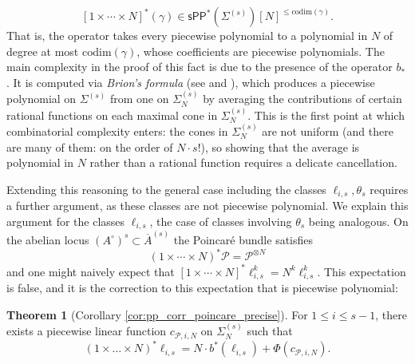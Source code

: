 \documentclass[11pt]{article}
\def\codim{\mathrm{codim}}
\newcommand{\barA}{\overline{A}}
\newcommand{\sPP}{\mathsf{sPP}}
\newcommand{\spp}{\sPP}
\theoremstyle{definition}
\newtheorem{theorem}[definition]{Theorem}
\begin{document}
\begin{equation}\label{eq:PPisNpoly}
[1 \times \cdots \times N]^*(\gamma) \in \spp^{\ast}(\Sigma^{(s)})[N]^{\le \codim(\gamma)}.
\end{equation}
That is, the operator takes every piecewise polynomial to a polynomial in $N$
of degree at most $\codim(\gamma)$, whose coefficients are piecewise
polynomials. The main complexity in the proof of this fact is due to the
presence of the operator $b_*$. It is computed via \emph{Brion's formula}
(see \cite{Brion} and \cite[Proposition~76]{LogarithmicTauPandha2024}),
which produces a piecewise polynomial on
$\Sigma^{(s)}$ from one on $\Sigma^{(s)}_N$ by averaging the contributions of
certain rational functions on each maximal cone in $\Sigma^{(s)}_N$. This is the
first point at which combinatorial complexity enters: the cones in
$\Sigma^{(s)}_N$ are not uniform (and there are many of them: on the order of $N\cdot s!$), so showing that the average is polynomial in
$N$ rather than a rational function requires a delicate cancellation.

Extending this reasoning to the general case including the classes $\ell_{i,s}, \theta_s$ requires a
further argument, as these classes are not piecewise polynomial. We explain this argument for the classes $\ell_{i,s}$, the case of classes involving $\theta_s$ being analogous. On the abelian locus $(A^{\circ})^s \subset \barA^{(s)}$ the Poincar\'e bundle satisfies
\[
(1 \times \cdots \times N)^*\mathcal{P} = \mathcal{P}^{\otimes N}
\]
and one might naively expect that $[1 \times \cdots \times N]^*\ell_{i,s}^k = N^k\ell_{i,s}^k$. This expectation is false, and it is the correction to this expectation that is piecewise polynomial:

\begin{theorem}[Corollary \ref{cor:pp_corr_poincare_precise}]\label{thm:pp_corr_poincare}
    For $1\le i \le s-1$, there exists a piecewise linear function $c_{\mathcal P,i,N}$ on $\Sigma_N^{(s)}$ such that
    \[
    (1\times\dots\times N)^{\ast}\ell_{i,s}=N \cdot b^{\ast} (\ell_{i,s}) + \Phi(c_{\mathcal P,i,N}).
    \]
\end{theorem}
\end{document}
